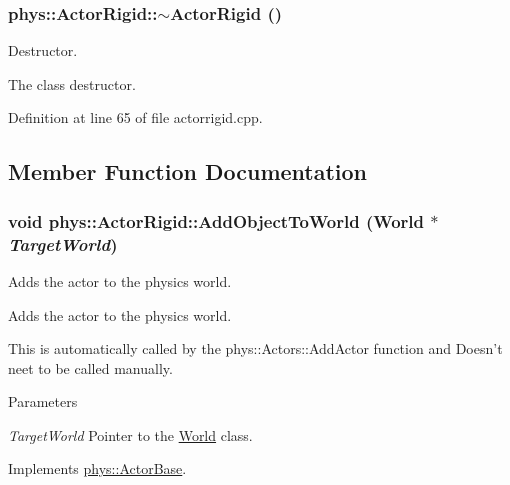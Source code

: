 \hypertarget{classphys_1_1ActorRigid_ab317b5a2578157e54655a1aea8f4d058}{
\subsubsection[{$\sim$ActorRigid}]{\setlength{\rightskip}{0pt plus 5cm}phys::ActorRigid::$\sim$ActorRigid ()}}
\label{d8/d71/classphys_1_1ActorRigid_ab317b5a2578157e54655a1aea8f4d058}


Destructor. 

The class destructor. 

Definition at line 65 of file actorrigid.cpp.



\subsection{Member Function Documentation}
\hypertarget{classphys_1_1ActorRigid_acaf29ca7058b39185dd09a5059200e91}{
\subsubsection[{AddObjectToWorld}]{\setlength{\rightskip}{0pt plus 5cm}void phys::ActorRigid::AddObjectToWorld ({\bf World} $\ast$ {\em TargetWorld})}}
\label{d8/d71/classphys_1_1ActorRigid_acaf29ca7058b39185dd09a5059200e91}


Adds the actor to the physics world. 

Adds the actor to the physics world. \par
 This is automatically called by the phys::Actors::AddActor function and Doesn't neet to be called manually. 
\begin{DoxyParams}{Parameters}
\item[{\em TargetWorld}]Pointer to the \hyperlink{classphys_1_1World}{World} class. \end{DoxyParams}


Implements \hyperlink{classphys_1_1ActorBase_a3d28e4c4a33f50210101695cb33ded3b}{phys::ActorBase}.



